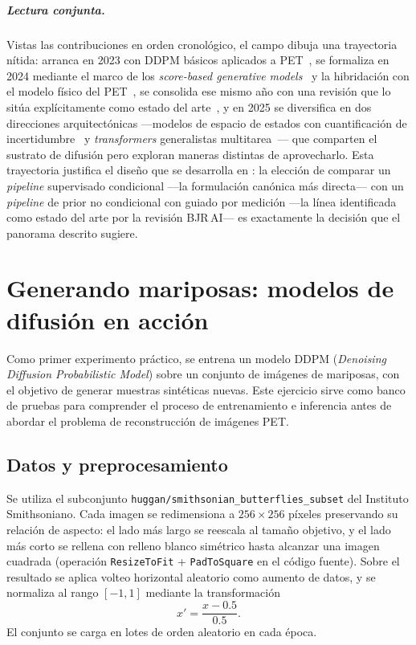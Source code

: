 \paragraph{Lectura conjunta.} Vistas las contribuciones en orden
cronológico, el campo dibuja una trayectoria nítida: arranca en
2023 con DDPM básicos aplicados a PET~\cite{ddpmpet2023}, se
formaliza en 2024 mediante el marco de los \emph{score-based
generative models}~\cite{scorepet2024} y la hibridación con el
modelo físico del PET~\cite{ddpem2024}, se consolida ese mismo año
con una revisión que lo sitúa explícitamente como estado del
arte~\cite{bjrai2024}, y en 2025 se diversifica en dos direcciones
arquitectónicas —modelos de espacio de estados con cuantificación
de incertidumbre~\cite{mamba2025} y \textit{transformers}
generalistas multitarea~\cite{tat2025}— que comparten el sustrato
de difusión pero exploran maneras distintas de aprovecharlo. Esta
trayectoria justifica el diseño que se desarrolla en
: la elección de comparar un \textit{pipeline}
supervisado condicional —la formulación canónica más directa— con
un \textit{pipeline} de prior no condicional con guiado por
medición —la línea identificada como estado del arte por la
revisión BJR\,AI— es exactamente la decisión que el panorama
descrito sugiere.

\chapter{Generando mariposas: modelos de difusión en acción}
\label{cap:mariposas}

Como primer experimento práctico, se entrena un modelo DDPM
(\textit{Denoising Diffusion Probabilistic Model}) sobre un
conjunto de imágenes de mariposas, con el objetivo de generar
muestras sintéticas nuevas. Este ejercicio sirve como banco de
pruebas para comprender el proceso de entrenamiento e inferencia
antes de abordar el problema de reconstrucción de imágenes PET.

\section{Datos y preprocesamiento}
\label{sec:mariposas-datos}

Se utiliza el subconjunto \texttt{huggan/smithsonian\_butterflies\_subset}
del Instituto Smithsoniano. Cada imagen se redimensiona a
$256 \times 256$ píxeles preservando su relación de aspecto: el
lado más largo se reescala al tamaño objetivo, y el lado más corto
se rellena con relleno blanco simétrico hasta alcanzar una imagen
cuadrada (operación \texttt{ResizeToFit} + \texttt{PadToSquare} en
el código fuente). Sobre el resultado se aplica volteo horizontal
aleatorio como aumento de datos, y se normaliza al rango $[-1, 1]$
mediante la transformación
\begin{equation}
    x' = \frac{x - 0.5}{0.5}.
\end{equation}
El conjunto se carga en lotes de orden aleatorio en cada época.

